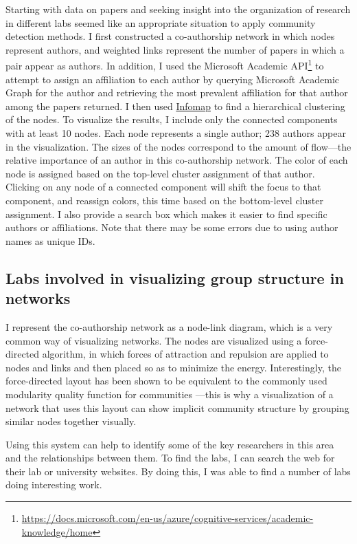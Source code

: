Starting with data on papers and seeking insight into the organization
of research in different labs seemed like an appropriate situation to
apply community detection methods. I first constructed a co-authorship
network in which nodes represent authors, and weighted links represent
the number of papers in which a pair appear as authors. In addition, I
used the Microsoft Academic API\footnote{\url{https://docs.microsoft.com/en-us/azure/cognitive-services/academic-knowledge/home}}
to attempt to assign an affiliation to each author by querying Microsoft
Academic Graph for the author and retrieving the most prevalent
affiliation for that author among the papers returned. I then used
\protect\hyperlink{the-dynamical-perspective}{Infomap} to find a
hierarchical clustering of the nodes. To visualize the results, I
include only the connected components with at least 10 nodes. Each node
represents a single author; 238 authors appear in the visualization. The
sizes of the nodes correspond to the amount of flow---the relative
importance of an author in this co-authorship network. The color of each
node is assigned based on the top-level cluster assignment of that
author. Clicking on any node of a connected component will shift the
focus to that component, and reassign colors, this time based on the
bottom-level cluster assignment. I also provide a search box which makes
it easier to find specific authors or affiliations. Note that there may
be some errors due to using author names as unique IDs.

\subsection{Labs involved in visualizing group structure in
networks}\label{labs-involved-in-visualizing-group-structure-in-networks}

I represent the co-authorship network as a node-link diagram, which is a
very common way of visualizing networks. The nodes are visualized using
a force-directed algorithm, in which forces of attraction and repulsion
are applied to nodes and links and then placed so as to minimize the
energy. Interestingly, the force-directed layout has been shown to be
equivalent to the commonly used modularity quality function for
communities \autocite{noack_modularity_2009}---this is why a
visualization of a network that uses this layout can show implicit
community structure by grouping similar nodes together visually.

Using this system can help to identify some of the key researchers in
this area and the relationships between them. To find the labs, I can
search the web for their lab or university websites. By doing this, I
was able to find a number of labs doing interesting work.

